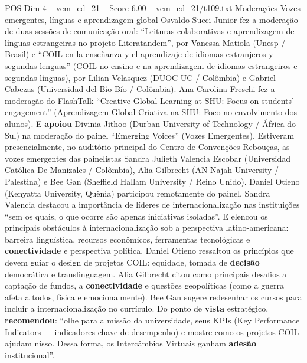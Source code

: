 \begin{textsample}{POS Dim 4 – vem\_ed\_21 – Score 6.00 – vem\_ed\_21/t109.txt}  \label{ex:f4_pos_096}
Moderações Vozes emergentes, línguas e aprendizagem global Osvaldo Succi Junior fez a moderação de duas sessões de comunicação oral: “Leituras colaborativas e aprendizagem de línguas estrangeiras no projeto Literatandem”, por Vanessa Matiola (Unesp / Brasil) e “COIL en la enseñanza y el aprendizaje de idiomas extranjeros y segundas lenguas” (COIL no ensino e na aprendizagem de idiomas estrangeiros e segundas línguas), por Lilian Velasquez (DUOC UC / Colômbia) e Gabriel Cabezas (Universidad del Bío-Bío / Colômbia).
Ana Carolina Freschi fez a moderação do FlashTalk “Creative Global Learning at SHU: Focus on students’ engagement” (Aprendizagem Global Criativa na SHU: Foco no envolvimento dos alunos).
E \textbf{apoiou} Divinia Jithoo (Durban University of Technology / África do Sul) na moderação do painel “Emerging Voices” (Vozes Emergentes).
Estiveram presencialmente, no auditório principal do Centro de Convenções Rebouças, as vozes emergentes das painelistas Sandra Julieth Valencia Escobar (Universidad Católica De Manizales / Colômbia), Alia Gilbrecht (AN-Najah University / Palestina) e Bee Gan (Sheffield Hallam University / Reino Unido).
Daniel Otieno (Kenyatta University, Quênia) participou remotamente do painel.
Sandra Valencia destacou a importância de líderes de internacionalização nas instituições “sem os quais, o que ocorre são apenas iniciativas isoladas”.
E elencou os principais obstáculos à internacionalização sob a perspectiva latino-americana: barreira linguística, recursos econômicos, ferramentas tecnológicas e \textbf{conectividade} e perspectiva política.
Daniel Otieno ressaltou os princípios que devem guiar o design de projetos COIL: equidade, tomada de \textbf{decisão} democrática e translinguagem.
Alia Gilbrecht citou como principais desafios a captação de fundos, a \textbf{conectividade} e questões geopolíticas (como a guerra afeta a todos, física e emocionalmente).
Bee Gan sugere redesenhar os cursos para incluir a internacionalização no currículo.
Do ponto de \textbf{vista} estratégico, \textbf{recomendou}: “olhe para a missão da universidade, seus KPIs (Key Performance Indicators — indicadores-chave de desempenho) e mostre como os projetos COIL ajudam nisso.
Dessa forma, os Intercâmbios Virtuais ganham \textbf{adesão} institucional”.

\end{textsample}
